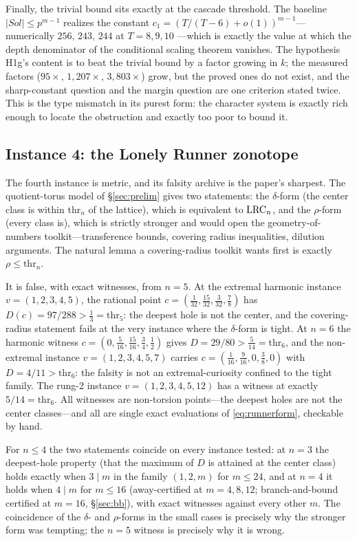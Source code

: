 Finally, the trivial bound sits exactly at the cascade threshold. The
baseline $|Sol|\le p^{m-1}$ realizes the constant
$c_1=(T/(T-6)+o(1))^{m-1}$---numerically $256$, $243$, $244$ at $T=8,9,10$
---which is exactly the value at which the depth denominator of the
conditional scaling theorem vanishes. The hypothesis H1g's content is to
beat the trivial bound by a factor growing in $k$; the measured factors
($95\times$, $1{,}207\times$, $3{,}803\times$) grow, but the proved ones
do not exist, and the sharp-constant question and the margin question
are one criterion stated twice. This is the type mismatch in its purest
form: the character system is exactly rich enough to locate the
obstruction and exactly too poor to bound it.

\subsection{Instance 4: the Lonely Runner zonotope}\label{sec:tm-zono}

The fourth instance is metric, and its falsity archive is the paper's
sharpest. The quotient-torus model of \S\ref{sec:prelim} gives two
statements: the $\delta$-form (the center class is within
$\mathrm{thr}_n$ of the lattice), which is equivalent to $\mathrm{LRC}_n$, and
the $\rho$-form (every class is), which is strictly stronger and would
open the geometry-of-numbers toolkit---transference bounds, covering
radius inequalities, dilution arguments. The natural lemma a
covering-radius toolkit wants first is exactly $\rho\le\mathrm{thr}_n$.

It is false, with exact witnesses, from $n=5$. At the extremal harmonic
instance $v=(1,2,3,4,5)$, the rational point
$c=(\tfrac1{32},\tfrac{15}{32},\tfrac3{32},\tfrac78)$ has
$D(c)=97/288>\tfrac13=\mathrm{thr}_5$: the deepest hole is not the
center, and the covering-radius statement fails at the very instance
where the $\delta$-form is tight. At $n=6$ the harmonic witness
$c=(0,\tfrac5{16},\tfrac{15}{16},\tfrac34,\tfrac12)$ gives
$D=29/80>\tfrac5{14}=\mathrm{thr}_6$, and the non-extremal instance
$v=(1,2,3,4,5,7)$ carries $c=(\tfrac1{16},\tfrac9{16},0,\tfrac38,0)$
with $D=4/11>\mathrm{thr}_6$: the falsity is not an extremal-curiosity
confined to the tight family. The rung-2 instance
$v=(1,2,3,4,5,12)$ has a witness at exactly $5/14=\mathrm{thr}_6$. All
witnesses are non-torsion points---the deepest holes are not the center
classes---and all are single exact evaluations of \eqref{eq:runnerform},
checkable by hand.

For $n\le4$ the two statements coincide on every instance tested: at
$n=3$ the deepest-hole property (that the maximum of $D$ is attained at
the center class) holds exactly when $3\mid m$ in the family
$(1,2,m)$ for $m\le24$, and at $n=4$ it holds when
$4\mid m$ for $m\le16$ (away-certified at $m=4,8,12$;
branch-and-bound certified at $m=16$, \S\ref{sec:bb}), with exact
witnesses against every other $m$.
The coincidence of the $\delta$- and $\rho$-forms in the small cases is
precisely why the stronger form was tempting; the $n=5$ witness is
precisely why it is wrong.

